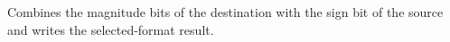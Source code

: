 Combines the magnitude bits of the destination with the sign bit of the source and writes the selected-format result.

